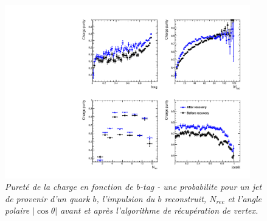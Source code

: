 

\begin{figure}
	{\centering
		\includegraphics[width=0.95\textwidth]{ILD/plots/recovery-purity-comparison.pdf}
		\caption{\sl Pureté de la charge en fonction de b-tag - une probabilite pour un jet de provenir d'un quark $b$, l'impulsion du $b$ reconstruit, $N_ {rec}$ et l'angle polaire $|\cos\theta|$ avant et après l'algorithme de récupération de vertex. 
		}
		\label{fig:RecoveryPurityComparison_3F}
	}
\end{figure}

